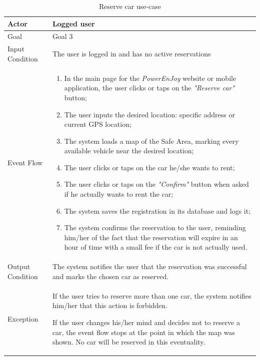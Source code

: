 \begin{table}[H]
\begin{center}
\begin{tabular}{p{} | p{}}
\hline
Actor & Logged user\\
\hline
Goal & Goal 3\\
\hline
Input Condition & The user is logged in and has no active reservations\\
\hline
Event Flow & 
\begin{enumerate}
\item In the main page for the \emph{PowerEnJoy} website or mobile application, the user clicks or taps on the \emph{"Reserve car"} button;
\item The user inputs the desired location: specific address or current GPS location;
\item The system loads a map of the Safe Area, marking every available vehicle near the desired location;
\item The user clicks or taps on the car he/she wants to rent;
\item The user clicks or taps on the \emph{"Confirm"} button when asked if he actually wants to rent the car;
\item The system saves the registration in its database and logs it;
\item The system confirms the reservation to the user, reminding him/her of the fact that the reservation will expire in an hour of time with a small fee if the car is not actually used.
\end{enumerate} \\
\hline
Output Condition & The system notifies the user that the reservation was successful and marks the chosen car as reserved.\\
\hline
Exception & If the user tries to reserve more than one car, the system notifies him/her that this action is forbidden.

If the user changes his/her mind and decides not to reserve a car, the event flow stops at the point in which the map was shown. No car will be reserved in this eventuality.\\
\hline
\end{tabular}
\end{center}
\caption{Reserve car use-case}
\label{reserve_car_uc}
\end{table}

